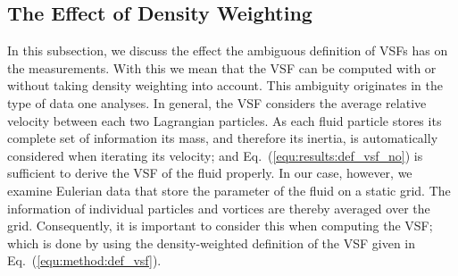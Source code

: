 

\subsection{The Effect of Density Weighting}\label{discussion:densweight}


In this subsection, we discuss the effect the ambiguous definition of VSFs has on the measurements. 
With this we mean that the VSF can be computed with or without taking density weighting into account.
This ambiguity originates in the type of data one analyses.
In general, the VSF considers the average relative velocity between each two Lagrangian particles.
As each fluid particle stores its complete set of information its mass, and therefore its inertia, is automatically considered when iterating its velocity; and Eq.~(\ref{equ:results:def_vsf_no}) is sufficient to derive the VSF of the fluid properly.
In our case, however, we examine Eulerian data that store the parameter of the fluid on a static grid. 
The information of individual particles and vortices are thereby averaged over the grid.
Consequently, it is important to consider this when computing the VSF; which is done by using the density-weighted definition of the VSF given in Eq.~(\ref{equ:method:def_vsf}).

